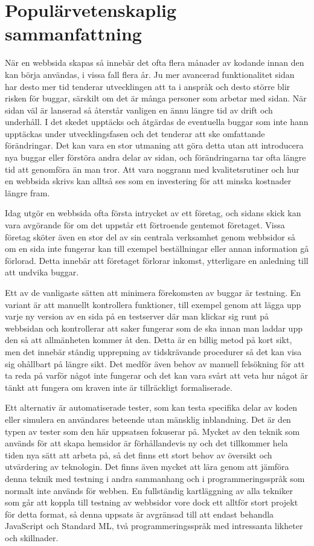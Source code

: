 \newpage
\null
\newpage

\section*{Populärvetenskaplig sammanfattning}

När en webbsida skapas så innebär det ofta flera månader av kodande innan den kan börja användas, i vissa fall flera år. Ju mer avancerad funktionalitet sidan har desto mer tid tenderar utvecklingen att ta i anspråk och desto större blir risken för buggar, särskilt om det är många personer som arbetar med sidan. När sidan väl är lanserad så återstår vanligen en ännu längre tid av drift och underhåll. I det skedet upptäcks och åtgärdas de eventuella buggar som inte hann upptäckas under utvecklingsfasen och det tenderar att ske omfattande förändringar. Det kan vara en stor utmaning att göra detta utan att introducera nya buggar eller förstöra andra delar av sidan, och förändringarna tar ofta längre tid att genomföra än man tror. Att vara noggrann med kvalitetsrutiner och hur en webbsida skrivs kan alltså ses som en investering för att minska kostnader längre fram.

Idag utgör en webbsida ofta första intrycket av ett företag, och sidans skick kan vara avgörande för om det uppstår ett förtroende gentemot företaget. Vissa företag sköter även en stor del av sin centrala verksamhet genom webbsidor så om en sida inte fungerar kan till exempel beställningar eller annan information gå förlorad. Detta innebär att företaget förlorar inkomst, ytterligare en anledning till att undvika buggar.

Ett av de vanligaste sätten att minimera förekomsten av buggar är testning. En variant är att manuellt kontrollera funktioner, till exempel genom att lägga upp varje ny version av en sida på en testserver där man klickar sig runt på webbsidan och kontrollerar att saker fungerar som de ska innan man laddar upp den så att allmänheten kommer åt den. Detta är en billig metod på kort sikt, men det innebär ständig upprepning av tidskrävande procedurer så det kan visa sig ohållbart på längre sikt. Det medför även behov av manuell felsökning för att ta reda på varför något inte fungerar och det kan vara svårt att veta hur något är tänkt att fungera om kraven inte är tillräckligt formaliserade.

Ett alternativ är automatiserade tester, som kan testa specifika delar av koden eller simulera en användares beteende utan mänsklig inblandning. Det är den typen av tester som den här uppsatsen fokuserar på. Mycket av den teknik som används för att skapa hemsidor är förhållandevis ny och det tillkommer hela tiden nya sätt att arbeta på, så det finns ett stort behov av översikt och utvärdering av teknologin. Det finns även mycket att lära genom att jämföra denna teknik med testning i andra sammanhang och i programmeringsspråk som normalt inte används för webben. En fullständig kartläggning av alla tekniker som går att koppla till testning av webbsidor vore dock ett alltför stort projekt för detta format, så denna uppsats är avgränsad till att endast behandla JavaScript och Standard ML, två programmeringsspråk med intressanta likheter och skillnader.

